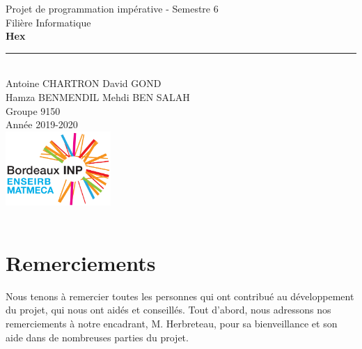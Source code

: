 \documentclass[a4paper, 12pt]{article}
\date{Mai 2020}
\begin{document}
\renewcommand{\lstlistingname}{Programme}
\thispagestyle{empty}

\vfill
\begin{center}
  \vspace*{1.5cm}
  \LARGE Projet de programmation impérative - Semestre 6\\[1cm]
  \Large Filière Informatique\\[2cm]
  {\Huge \bfseries Hex\\[0.4cm]}
  \rule{\linewidth}{0.1cm}\\[2cm]
  {\Large Antoine CHARTRON \quad David GOND \\\quad Hamza BENMENDIL \quad Mehdi BEN SALAH}\\[0.5cm]
  \Large Groupe 9150 \\[1cm]
  \Large Année 2019-2020 \\ [3cm]
  \includegraphics[width=0.3\textwidth]{./pictures/logo.png}\\[0.5cm]
  \LARGE {}\\[1.5cm]
  \vfill

\end{center}

\newpage
\thispagestyle{empty}
\section*{Remerciements}
Nous tenons à remercier toutes les personnes qui ont contribué au développement du projet, qui nous ont aidés et conseillés.
Tout d'abord, nous adressons nos remerciements à notre encadrant, M. Herbreteau, pour sa bienveillance et son aide dans de nombreuses parties du projet.
\end{document}

